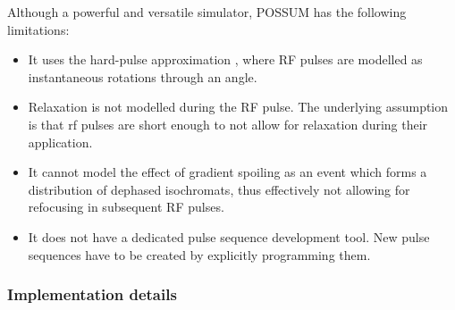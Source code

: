 Although a powerful and versatile simulator, POSSUM has the following limitations:
\begin{itemize}
    
    \item It uses the hard-pulse approximation \cite{bernsteinhandbook}, where RF pulses are modelled as instantaneous rotations through an angle.
    
    \item Relaxation is not modelled during the RF pulse.
    The underlying assumption is that \ac{rf} pulses are short enough to not allow for relaxation during their application. 
    
    \item It cannot model the effect of gradient spoiling as an event which forms a distribution of dephased isochromats, thus effectively not allowing for refocusing in subsequent RF pulses.
    
    \item It does not have a dedicated pulse sequence development tool. 
    New pulse sequences have to be created by explicitly programming them.
    
\end{itemize}

\hfill

\subsubsection{Implementation details}

